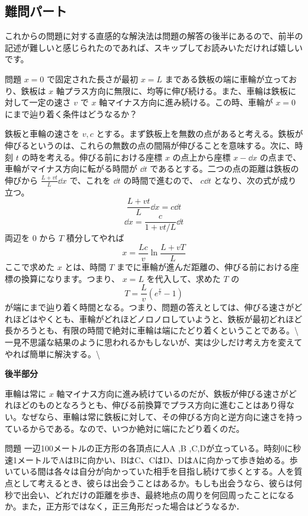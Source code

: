 \documentclass[
  b4paperpaper,
  xelatex,ja=standard]{bxjsbook}
\begin{document}
\hypertarget{ux96e3ux554fux30d1ux30fcux30c8}{%
\subsection{難問パート}\label{ux96e3ux554fux30d1ux30fcux30c8}}

これからの問題に対する直感的な解決法は問題の解答の後半にあるので、前半の記述が難しいと感じられたのであれば、スキップしてお読みいただければ嬉しいです。

\begin{Qbox}{問題}
\(x=0\) で固定された長さが最初 \(x=L\)
まである鉄板の端に車輪が立っており、鉄板は \(x\)
軸プラス方向に無限に、均等に伸び続ける。また、車輪は鉄板に対して一定の速さ
\(v\) で \(x\) 軸マイナス方向に進み続ける。この時、車輪が \(x=0\)
にまで辿り着く条件はどうなるか？

\end{Qbox}


鉄板と車輪の速さを \(v,c\)
とする。まず鉄板上を無数の点があると考える。鉄板が伸びるというのは、これらの無数の点の間隔が伸びることを意味する。次に、時刻
\(t\) の時を考える。伸びる前における座標 \(x\) の点上から座標
\(x-\dd x\) の点まで、車輪がマイナス方向に転がる時間が \(\dd t\)
であるとする。二つの点の距離は鉄板の伸びから \(\frac{L+vt}{L}\dd x\)
で、これを \(\dd t\) の時間で進むので、 \(c\dd t\)
となり、次の式が成り立つ。 \[\frac{L+vt}{L}\dd x=c\dd t\]
\[\dd x=\frac{c}{1+vt/L}\dd t\] 両辺を \(0\) から \(T\) 積分してやれば
\[x=\frac{Lc}{v}\ln \frac{L+vT}{L}\] ここで求めた \(x\) とは、時間 \(T\)
までに車輪が進んだ距離の、伸びる前における座標の換算になります。つまり、
\(x=L\) を代入して、求めた \(T\) の \[T=\frac{L}{v}(e^{\frac{v}{c}}-1)\]
が端にまで辿り着く時間となる。つまり、問題の答えとしては、伸びる速さがどれほどはやくとも、車輪がどれほどノロノロしていようと、鉄板が最初どれほど長かろうとも、有限の時間で絶対に車輪は端にたどり着くということである。\textbackslash{}
一見不思議な結果のように思われるかもしないが、実は少しだけ考え方を変えてやれば簡単に解決する。\textbackslash{}

\textbf{後半部分}

車輪は常に \(x\)
軸マイナス方向に進み続けているのだが、鉄板が伸びる速さがどれほどのものとなろうとも、伸びる前換算でプラス方向に進むことはあり得ない。なぜなら、車輪は常に鉄板に対して、その伸びる方向と逆方向に速さを持っているからである。なので、いつか絶対に端にたどり着くのだ。

\begin{Qbox}{問題}
一辺100メートルの正方形の各頂点に人A ,B
,C,Dが立っている。時刻0に秒速1メートルでAはBに向かい、BはC、CはD、DはAに向かって歩き始める。歩いている間は各々は自分が向かっていた相手を目指し続けて歩くとする。人を質点として考えるとき、彼らは出会うことはあるか。もしも出会うなら、彼らは何秒で出会い、どれだけの距離を歩き、最終地点の周りを何回周ったことになるか。また，正方形ではなく，正三角形だった場合はどうなるか．

\end{Qbox}
\end{document}
